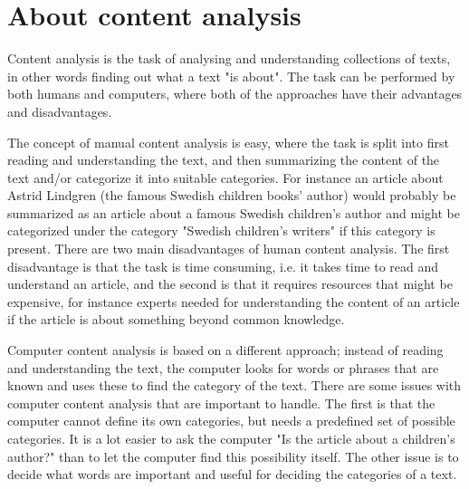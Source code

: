 \section{About content analysis}
Content analysis is the task of analysing and understanding collections of texts, in other words finding out what a text "is about". The task can be performed by both humans and computers, where both of the approaches have their advantages and disadvantages.

The concept of manual content analysis is easy, where the task is split into first reading and understanding the text, and then summarizing the content of the text and/or categorize it into suitable categories. For instance an article about Astrid Lindgren (the famous Swedish children books' author) would probably be summarized as an article about a famous Swedish children's author and might be categorized under the category "Swedish children's writers" if this category is present.  
There are two main disadvantages of human content analysis. The first disadvantage is that the task is time consuming, i.e. it takes time to read and understand an article, and the second is that it requires resources that might be expensive, for instance experts needed for understanding the content of an article if the article is about something beyond common knowledge.


Computer content analysis is based on a different approach; instead of reading and understanding the text, the computer looks for words or phrases that are known and uses these to find the category of the text. There are some issues with computer content analysis that are important to handle. The first is that the computer cannot define its own categories, but needs a predefined set of possible categories. It is a lot easier to ask the computer "Is the article about a children's author?" than to let the computer find this possibility itself. The other issue is to decide what words are important and useful for deciding the categories of a text. 

